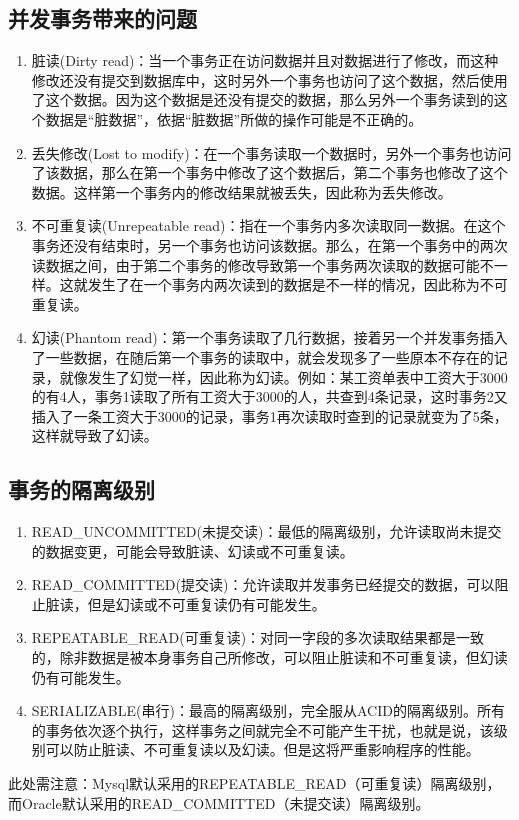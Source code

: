 \documentclass[a4paper]{report}
\begin{document}
\subsection{并发事务带来的问题}
\begin{enumerate}
    \item 脏读(Dirty read)：当一个事务正在访问数据并且对数据进行了修改，而这种修改还没有提交到数据库中，这时另外一个事务也访问了这个数据，然后使用了这个数据。因为这个数据是还没有提交的数据，那么另外一个事务读到的这个数据是“脏数据”，依据“脏数据”所做的操作可能是不正确的。
    \item 丢失修改(Lost to modify)：在一个事务读取一个数据时，另外一个事务也访问了该数据，那么在第一个事务中修改了这个数据后，第二个事务也修改了这个数据。这样第一个事务内的修改结果就被丢失，因此称为丢失修改。
    \item 不可重复读(Unrepeatable read)：指在一个事务内多次读取同一数据。在这个事务还没有结束时，另一个事务也访问该数据。那么，在第一个事务中的两次读数据之间，由于第二个事务的修改导致第一个事务两次读取的数据可能不一样。这就发生了在一个事务内两次读到的数据是不一样的情况，因此称为不可重复读。
    \item 幻读(Phantom read)：第一个事务读取了几行数据，接着另一个并发事务插入了一些数据，在随后第一个事务的读取中，就会发现多了一些原本不存在的记录，就像发生了幻觉一样，因此称为幻读。例如：某工资单表中工资大于3000的有4人，事务1读取了所有工资大于3000的人，共查到4条记录，这时事务2又插入了一条工资大于3000的记录，事务1再次读取时查到的记录就变为了5条，这样就导致了幻读。
\end{enumerate}

\subsection{事务的隔离级别}
\begin{enumerate}
    \item READ\_UNCOMMITTED(未提交读)：最低的隔离级别，允许读取尚未提交的数据变更，可能会导致脏读、幻读或不可重复读。
    \item READ\_COMMITTED(提交读)：允许读取并发事务已经提交的数据，可以阻止脏读，但是幻读或不可重复读仍有可能发生。
    \item REPEATABLE\_READ(可重复读)：对同一字段的多次读取结果都是一致的，除非数据是被本身事务自己所修改，可以阻止脏读和不可重复读，但幻读仍有可能发生。
    \item SERIALIZABLE(串行)：最高的隔离级别，完全服从ACID的隔离级别。所有的事务依次逐个执行，这样事务之间就完全不可能产生干扰，也就是说，该级别可以防止脏读、不可重复读以及幻读。但是这将严重影响程序的性能。
\end{enumerate}
此处需注意：Mysql默认采用的REPEATABLE\_READ（可重复读）隔离级别，而Oracle默认采用的READ\_COMMITTED（未提交读）隔离级别。
\end{document}
